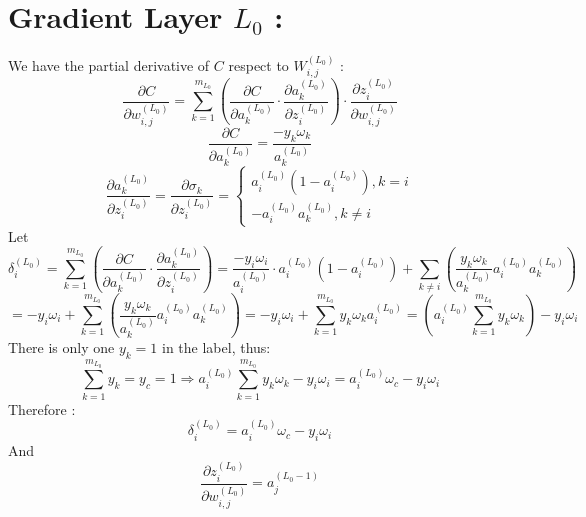 \documentclass{article}
\begin{document}
    \section*{Gradient Layer $L_0$ :}
    We have the partial derivative of $C$ respect to $W^{(L_0)}_{i, j}$ : 
    \[
        \frac{\partial C}{\partial w^{(L_0)}_{i, j}} = 
        \sum_{k = 1}^{m_{L_0}}\left(
            \frac{\partial C}{\partial a^{(L_0)}_{k}} \cdot
            \frac{\partial a^{(L_0)}_{k}}{\partial z^{(L_0)}_i} 
        \right) \cdot
        \frac{\partial z^{(L_0)}_i}{\partial w^{(L_0)}_{i, j}}
    \]  
    \[
        \frac{\partial C}{\partial a^{(L_0)}_{k}} = 
        \frac{-y_k\omega_k}{a_k^{(L_0)}}
    \]
    \[
        \frac{\partial a^{(L_0)}_{k}}{\partial z^{(L_0)}_i} = 
        \frac{\partial \sigma_k}{\partial z^{(L_0)}_i} = \begin{cases}
            a^{(L_0)}_{i}(1-a^{(L_0)}_{i}) , k = i \\
            -a^{(L_0)}_{i}a^{(L_0)}_{k} , k \neq i
        \end{cases}
    \]
    Let
    \[
        \delta^{(L_0)}_i = 
        \sum_{k = 1}^{m_{L_0}}\left(
            \frac{\partial C}{\partial a^{(L_0)}_{k}} \cdot
            \frac{\partial a^{(L_0)}_{k}}{\partial z^{(L_0)}_i}
        \right) = 
        \frac{-y_i\omega_i}{a_i^{(L_0)}} \cdot a^{(L_0)}_{i}(1-a^{(L_0)}_{i}) + 
        \sum_{k \neq i}\left(
            \frac{y_k\omega_k}{a_k^{(L_0)}}a^{(L_0)}_{i}a^{(L_0)}_{k}
        \right)
    \]
    \[
        = -y_i\omega_i + \sum_{k = 1}^{m_{L_0}}\left(
            \frac{y_k\omega_k}{a_k^{(L_0)}}a^{(L_0)}_{i}a^{(L_0)}_{k}
        \right) = 
        -y_i\omega_i + \sum_{k = 1}^{m_{L_0}}y_k\omega_ka^{(L_0)}_{i} = 
        \left(a^{(L_0)}_{i}\sum_{k = 1}^{m_{L_0}}y_k\omega_k\right) - y_i\omega_i
    \]
    There is only one $y_k = 1$ in the label, thus:
    \[
        \sum_{k = 1}^{m_{L_0}}y_k = y_c = 1 
        \Rightarrow a^{(L_0)}_{i}\sum_{k = 1}^{m_{L_0}}y_k\omega_k - y_i\omega_i = a_i^{(L_0)}\omega_c - y_i\omega_i
    \] 
    Therefore : 
    \[
        \delta^{(L_0)}_i = a_i^{(L_0)}\omega_c - y_i\omega_i
    \]
    And 
    \[
        \frac{\partial z^{(L_0)}_i}{\partial w^{(L_0)}_{i, j}} = a^{(L_0-1)}_j
    \]  
\end{document}
